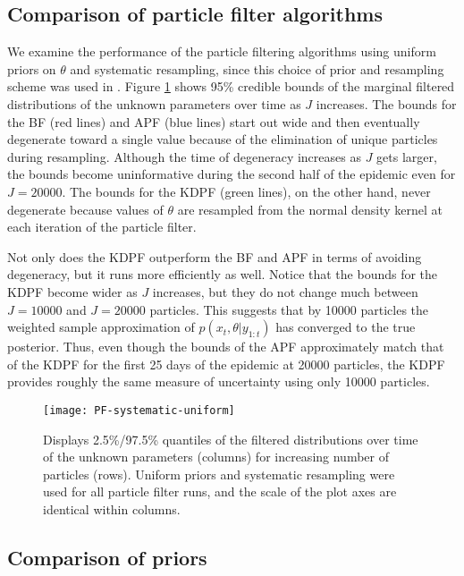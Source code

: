\documentclass{elsarticle}
\begin{document}
\subsection{Comparison of particle filter algorithms} \label{sec:pfcomparison}

We examine the performance of the particle filtering algorithms using uniform priors on $\theta$ and systematic resampling, since this choice of prior and resampling scheme was used in \citet{skvortsov2012monitoring}.  Figure \ref{fig:pfs} shows 95\% credible bounds of the marginal filtered distributions of the unknown parameters over time as $J$ increases.  The bounds for the BF (red lines) and APF (blue lines) start out wide and then eventually degenerate toward a single value because of the elimination of unique particles during resampling.  Although the time of degeneracy increases as $J$ gets larger, the bounds become uninformative during the second half of the epidemic even for $J = 20000$.  The bounds for the KDPF (green lines), on the other hand, never degenerate because values of $\theta$ are resampled from the normal density kernel at each iteration of the particle filter.

Not only does the KDPF outperform the BF and APF in terms of avoiding degeneracy, but it runs more efficiently as well.  Notice that the bounds for the KDPF become wider as $J$ increases, but they do not change much between $J = 10000$ and $J = 20000$ particles.  This suggests that by 10000 particles the weighted sample approximation of $p(x_t,\theta|y_{1:t})$ has converged to the true posterior.  Thus, even though the bounds of the APF approximately match that of the KDPF for the first 25 days of the epidemic at 20000 particles, the KDPF provides roughly the same measure of uncertainty using only 10000 particles.

\begin{figure}
\centering
\texttt{[image: PF-systematic-uniform]}
\caption{Displays 2.5\%/97.5\% quantiles of the filtered distributions over time of the unknown parameters (columns) for increasing number of particles (rows).  Uniform priors and systematic resampling were used for all particle filter runs, and the scale of the plot axes are identical within columns.} \label{fig:pfs}
\end{figure}

\subsection{Comparison of priors}
\end{document}
